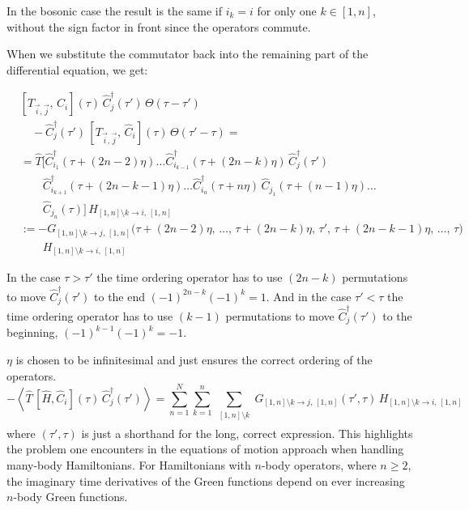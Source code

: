In the bosonic case the result is the same if $i_k = i$ for only one $k \in [1,n]$, without the sign factor in front since the operators commute.

When we substitute the commutator back into the remaining part of the differential equation, we get:

\begin{align*}
    &\left[ T_{\vec{i},\vec{j}},\, \hat{C}_i \right](\tau)\, \hat{C}_j^{\dagger}(\tau')\, \Theta(\tau-\tau') \\
    &\quad - \hat{C}_j^{\dagger}(\tau')\, \left[ T_{\vec{i},\vec{j}},\, \hat{C}_i \right](\tau)\, \Theta(\tau'-\tau) = \\[1ex]
    &= \hat{T}\Big[ \hat{C}_{i_1}^{\dagger}(\tau + (2n-2)\eta) \dots \hat{C}_{i_{k-1}}^{\dagger}(\tau + (2n-k)\eta)\, \hat{C}_j^{\dagger}(\tau') \\
    &\qquad \hat{C}_{i_{k+1}}^{\dagger}(\tau + (2n-k-1)\eta) \dots \hat{C}_{i_n}^{\dagger}(\tau + n\eta)\, \hat{C}_{j_1}(\tau + (n-1)\eta) \dots \\
    &\qquad \hat{C}_{j_n}(\tau) \Big]\, H_{[1,n]\setminus k \to i,\, [1,n]} \\[1ex]
    &:= -G_{[1,n]\setminus k \to j,\, [1,n]}\big(\tau + (2n-2)\eta,\, \dots,\, \tau + (2n-k)\eta,\, \tau',\, \tau + (2n-k-1)\eta,\, \dots,\, \tau\big) \\
    &\qquad H_{[1,n]\setminus k \to i,\, [1,n]}
\end{align*}

In the case $\tau > \tau'$ the time ordering operator has to use $(2n-k)$ permutations to move $\hat{C}_j^{\dagger}(\tau')$ to the end $(-1)^{2n-k}(-1)^k = 1$. And in the case $\tau' < \tau$ the time ordering operator has to use $(k-1)$ permutations to move $\hat{C}_j^{\dagger}(\tau')$ to the beginning, $(-1)^{k-1}(-1)^k = -1$.

$\eta$ is chosen to be infinitesimal and just ensures the correct ordering of the operators.
\begin{equation*}
    - \left\langle \hat{T}\, [\hat{H}, \hat{C}_i](\tau)\, \hat{C}_j^{\dagger}(\tau') \right\rangle = \sum_{n=1}^{N} \sum_{k=1}^{n} \sum_{\substack{[1,n]\setminus k \\ [1,n]}} G_{[1,n]\setminus k \to j,\, [1,n]}(\tau',\tau)\, H_{[1,n]\setminus k \to i,\, [1,n]}
\end{equation*}
where $(\tau',\tau)$ is just a shorthand for the long, correct expression.
This highlights the problem one encounters in the equations of motion approach when handling many-body Hamiltonians.
For Hamiltonians with $n$-body operators, where $n \geq 2$, the imaginary time derivatives of the Green functions depend on ever increasing $n$-body Green functions.


